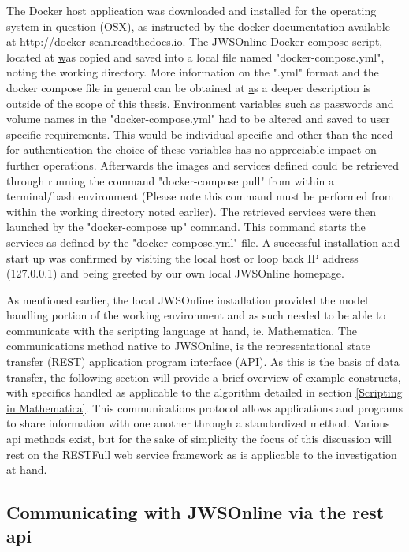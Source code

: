 The Docker host application was downloaded and installed for the operating system in question (OSX), as instructed by the docker documentation available at \href{http://docker-sean.readthedocs.io}{http://docker-sean.readthedocs.io}. The JWSOnline Docker compose script, located at \href{http://jws-docs.readthedocs.io/10_docker.html#building-the-jws-online-docker-image} was copied and saved into a local file named "docker-compose.yml", noting the working directory. More information on the ".yml" format and the docker compose file in general can be obtained at \href{https://docs.docker.com/compose/compose-file/#compose-file-structure-and-examples} as a deeper description is outside of the scope of this thesis. 
Environment variables such as passwords and volume names in the "docker-compose.yml" had to be altered and saved to user specific requirements. This would be individual specific and other than the need for authentication the choice of these variables has no appreciable impact on further operations. Afterwards the images and services defined could be retrieved through running the command "docker-compose pull" from within a terminal/bash environment (Please note this command must be performed from within the working directory noted earlier). The retrieved services were then launched by the "docker-compose up" command. This command starts the services as defined by the "docker-compose.yml" file. A successful installation and start up was confirmed by visiting the local host or loop back IP address (127.0.0.1) and being greeted by our own local JWSOnline homepage.

As mentioned earlier, the local JWSOnline installation provided the model handling portion of the working environment and as such needed to be able to communicate with the scripting language at hand, ie. Mathematica. The communications method native to JWSOnline, is the representational state transfer (REST) application program interface (API). As this is the basis of data transfer, the following section will provide a brief overview of example constructs, with specifics handled as applicable to the algorithm detailed in section \ref{Scripting in Mathematica}. This communications protocol allows applications and programs to share information with one another through a standardized method. Various \gls{api} methods exist, but for the sake of simplicity the focus of this discussion will rest on the RESTFull web service framework as is applicable to the investigation at hand. 

\subsection{Communicating with JWSOnline via the \gls{rest} \gls{api}} \label{REST Communication}

